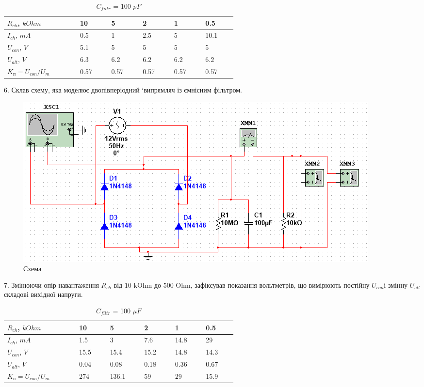 \documentclass{article}
\begin{document}
\begin{normalsize}
	\begin{table}[H]
		\centering
		\renewcommand*\arraystretch{1.3}
		\begin{tabular}{|p{0.15\linewidth}|p{0.08\linewidth}|p{0.08\linewidth}|p{0.08\linewidth}|p{0.08\linewidth}|p{0.08\linewidth}|}
			\hline
			$R_{ch}$, $kOhm$& 10 & 5 & 2 & 1 & 0.5\\
			\hline
			$I_{ch}$, $mA$& 0.5 & 1 & 2.5 & 5 & 10.1\\
			\hline
			$U_{con}$, $V$& 5.1 & 5 & 5 & 5 & 5\\
			\hline
			$U_{alt}$, $V$& 6.3 & 6.2 & 6.2 & 6.2 &6.2\\
			\hline
			$K_\text{п}=U_{con}/U_{m}$& 0.57 & 0.57 & 0.57 & 0.57 & 0.57\\
			\hline
		\end{tabular}
		\caption{$C_{filtr}$ = 100 $pF$}
	\end{table}
	
	6.  Склав схему, яка моделює двопівперіодний ‘випрямляч із ємнісним фільтром.
	
			\begin{figure}[H]
		\centering
		\includegraphics[width=\textwidth]{s3}
		\caption{Схема}
	\end{figure}
	
	
	7.  Змінюючи опір навантаження $R_{ch}$ від $10\text{ kOhm}$ до $500\text{ Ohm}$, зафіксував показання вольтметрів, що вимірюють постійну $U_{con}$і змінну $U_{alt}$ складові вихідної напруги.
	
	\begin{table}[H]
		\centering
		\renewcommand*\arraystretch{1.3}
		\begin{tabular}{|p{0.15\linewidth}|p{0.08\linewidth}|p{0.08\linewidth}|p{0.08\linewidth}|p{0.08\linewidth}|p{0.08\linewidth}|}
			\hline
			$R_{ch}$, $kOhm$& 10 & 5 & 2 & 1 & 0.5\\
			\hline
			$I_{ch}$, $mA$& 1.5 &3 & 7.6 & 14.8 & 29 \\
			\hline
			$U_{con}$, $V$& 15.5 & 15.4 & 15.2 & 14.8 & 14.3\\
			\hline
			$U_{alt}$, $V$& 0.04 & 0.08 & 0.18 & 0.36 & 0.67\\
			\hline
			$K_\text{п}=U_{con}/U_{m}$& 274 & 136.1 & 59 & 29 & 15.9\\
			\hline
		\end{tabular}
				\caption{$C_{filtr}$ = 100 $\mu F$}
	\end{table}
	

\end{normalsize}
\end{document}
